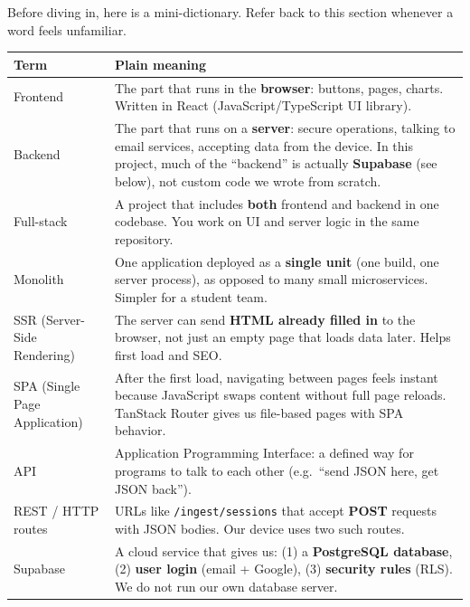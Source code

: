 \documentclass[11pt,a4paper]{article}
\newcommand{\keyword}[1]{\textbf{\textcolor{keyword}{#1}}}
\newcommand{\filepath}[1]{\texttt{#1}}
\begin{document}
Before diving in, here is a mini-dictionary. Refer back to this section whenever a word feels unfamiliar.

\begin{longtable}{@{}p{3.2cm}p{10.5cm}@{}}
\toprule
\textbf{Term} & \textbf{Plain meaning} \\
\midrule
\endhead

Frontend &
The part that runs in the \textbf{browser}: buttons, pages, charts. Written in React (JavaScript/TypeScript UI library). \\

Backend &
The part that runs on a \textbf{server}: secure operations, talking to email services, accepting data from the device. In this project, much of the ``backend'' is actually \textbf{Supabase} (see below), not custom code we wrote from scratch. \\

Full-stack &
A project that includes \textbf{both} frontend and backend in one codebase. You work on UI and server logic in the same repository. \\

Monolith &
One application deployed as a \textbf{single unit} (one build, one server process), as opposed to many small microservices. Simpler for a student team. \\

SSR (Server-Side Rendering) &
The server can send \textbf{HTML already filled in} to the browser, not just an empty page that loads data later. Helps first load and SEO. \\

SPA (Single Page Application) &
After the first load, navigating between pages feels instant because JavaScript swaps content without full page reloads. TanStack Router gives us file-based pages with SPA behavior. \\

API &
Application Programming Interface: a defined way for programs to talk to each other (e.g.\ ``send JSON here, get JSON back''). \\

REST / HTTP routes &
URLs like \filepath{/ingest/sessions} that accept \keyword{POST} requests with JSON bodies. Our device uses two such routes. \\

Supabase &
A cloud service that gives us: (1) a \textbf{PostgreSQL database}, (2) \textbf{user login} (email + Google), (3) \textbf{security rules} (RLS). We do not run our own database server. \\


\end{longtable}
\end{document}
